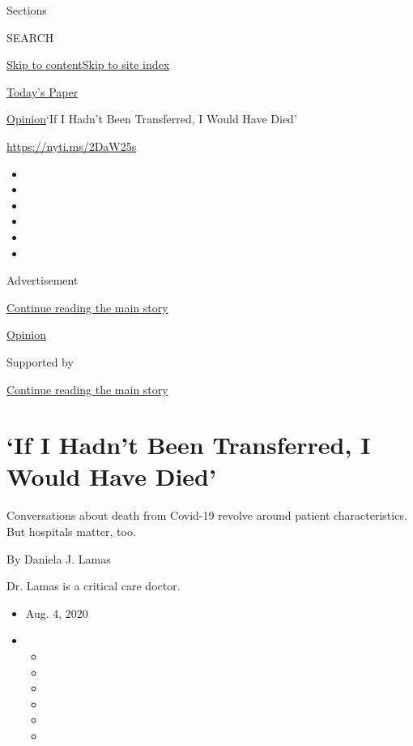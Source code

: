 Sections

SEARCH

\protect\hyperlink{site-content}{Skip to
content}\protect\hyperlink{site-index}{Skip to site index}

\href{https://myaccount.nytimes.com/auth/login?response_type=cookie\&client_id=vi}{}

\href{https://www.nytimes.com/section/todayspaper}{Today's Paper}

\href{/section/opinion}{Opinion}\textbar{}`If I Hadn't Been Transferred,
I Would Have Died'

\url{https://nyti.ms/2DaW25s}

\begin{itemize}
\item
\item
\item
\item
\item
\item
\end{itemize}

Advertisement

\protect\hyperlink{after-top}{Continue reading the main story}

\href{/section/opinion}{Opinion}

Supported by

\protect\hyperlink{after-sponsor}{Continue reading the main story}

\hypertarget{if-i-hadnt-been-transferred-i-would-have-died}{%
\section{`If I Hadn't Been Transferred, I Would Have
Died'}\label{if-i-hadnt-been-transferred-i-would-have-died}}

Conversations about death from Covid-19 revolve around patient
characteristics. But hospitals matter, too.

By Daniela J. Lamas

Dr. Lamas is a critical care doctor.

\begin{itemize}
\item
  Aug. 4, 2020
\item
  \begin{itemize}
  \item
  \item
  \item
  \item
  \item
  \item
  \end{itemize}
\end{itemize}

